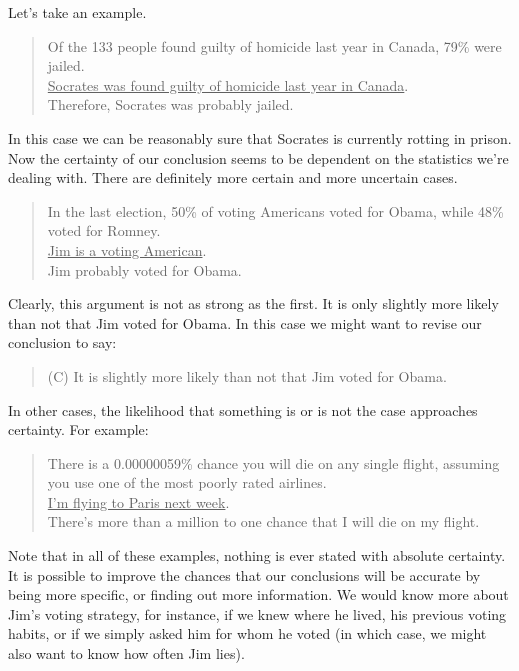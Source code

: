 Let's take an example.

\begin{quote}
Of the 133 people found guilty of homicide last year in Canada, 79\% were jailed. \\
\underline{Socrates was found guilty of homicide last year in Canada}. \\
Therefore, Socrates was probably jailed.
\end{quote}


In this case we can be reasonably sure that
Socrates is currently rotting in prison. Now the
certainty of our conclusion seems to be dependent on
the statistics we're dealing with. There are definitely
more certain and more uncertain cases.

\begin{quote}
In the last election, 50\% of voting Americans voted for Obama, while 48\% voted for Romney. \\
\underline{Jim is a voting American}. \\
Jim probably voted for Obama. \\
\end{quote}


Clearly, this argument is not as strong as the first.
It is only slightly more likely than not that Jim voted
for Obama. In this case we might want to revise our
conclusion to say:

\begin{quote}
(C) It is slightly more likely than not that Jim
voted for Obama. \\
\end{quote}

In other cases, the likelihood that something is or
is not the case approaches certainty. For example:

\begin{quote}
There is a 0.00000059\% chance you will die on any
single flight, assuming you use one of the most poorly
rated airlines. \\
\underline{I'm flying to Paris next week}. \\
There's more than a million to one chance that I will
die on my flight.\\
\end{quote}


Note that in all of these examples, nothing is ever
stated with absolute certainty. It is possible to improve
the chances that our conclusions will be accurate by
being more specific, or finding out more information.
We would know more about Jim's voting strategy,
for instance, if we knew where he lived, his previous
voting habits, or if we simply asked him for whom he
voted (in which case, we might also want to know how
often Jim lies).

